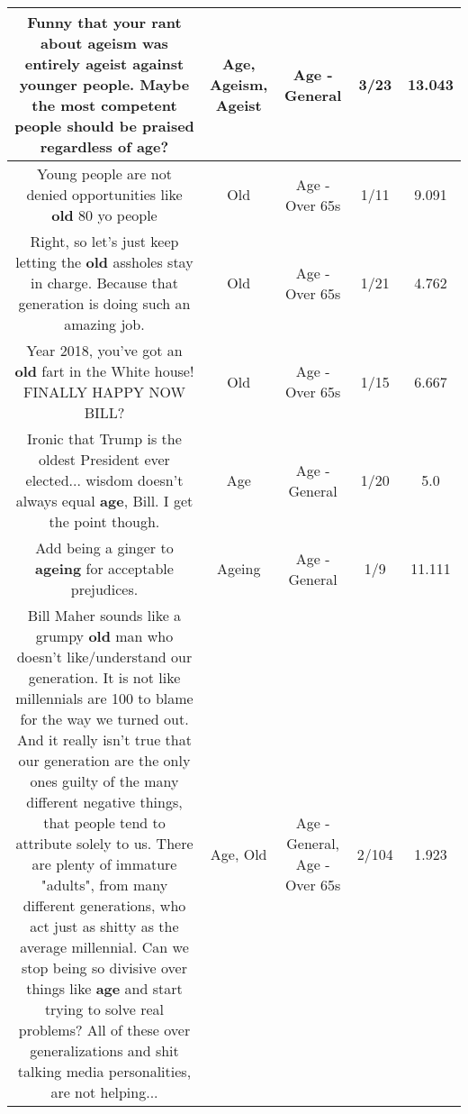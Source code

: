 \documentclass[11pt]{article}
\newlength\mylength
\begin{document}
\begin{center}
\begin{longtable}{|C{.65\mylength}|C{.30\mylength}|C{.12\mylength}|C{.12\mylength}|C{.12\mylength}|}
  \small Funny that your rant about \textbf{ageism} was entirely \textbf{ageist} against younger people. Maybe the most competent people should be praised regardless of \textbf{age}?\normalsize   & Age, Ageism, Ageist & Age - General & 3/23 & 13.043 \\  \hline
  \small Young people are not denied opportunities like \textbf{old} 80 yo people\normalsize   & Old & Age - Over 65s & 1/11 & 9.091 \\  \hline
  \small Right, so let's just keep letting the \textbf{old} assholes stay in charge. Because that generation is doing such an amazing job.\normalsize   & Old & Age - Over 65s & 1/21 & 4.762 \\  \hline
  \small Year 2018, you've got an \textbf{old} fart in the White house!  FINALLY HAPPY NOW BILL?\normalsize   & Old & Age - Over 65s & 1/15 & 6.667 \\  \hline
  \small Ironic that Trump is the oldest President ever elected... wisdom doesn't always equal \textbf{age}, Bill. I get the point though.\normalsize   & Age & Age - General & 1/20 & 5.0 \\  \hline
  \small Add being a ginger to \textbf{ageing} for acceptable prejudices.\normalsize   & Ageing & Age - General & 1/9 & 11.111 \\  \hline
  \small Bill Maher sounds like a grumpy \textbf{old} man who doesn't like/understand our generation. It is not like millennials are 100 to blame for the way we turned out. And it really isn't true that our generation are the only ones guilty of the many different negative things, that people tend to attribute solely to us. There are plenty of immature "adults", from many different generations, who act just as shitty as the average millennial. Can we stop being so divisive over things like \textbf{age} and start trying to solve real problems? All of these over generalizations and shit talking media personalities, are not helping...\normalsize   & Age, Old & Age - General, Age - Over 65s & 2/104 & 1.923 \\  \hline

\end{longtable}
\end{center}
\end{document}
